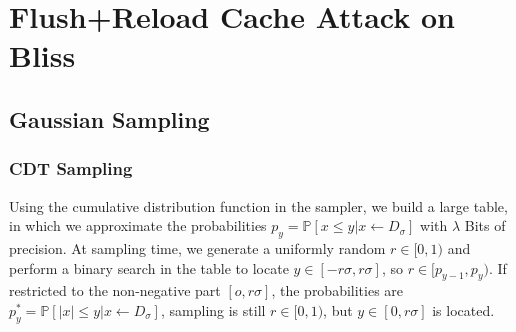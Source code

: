 %
%

\chapter{Flush+Reload Cache Attack on Bliss}
\label{bliss}

\section{Gaussian Sampling} %

\subsection{CDT Sampling}
Using the cumulative distribution function in the sampler, we build a large table, in which we approximate the probabilities $p_y=\mathbb{P}[x \le y| x \leftarrow D_\sigma ]$ with $\lambda$ Bits of precision. At sampling time, we generate a uniformly random $r \in [0,1)$ and perform a binary search in the table to locate $y \in [-r\sigma, r\sigma]$, so $r \in [p_{y-1}, p_y)$. If restricted to the non-negative part $[o, r\sigma]$, the probabilities are $p^*_y = \mathbb{P}[|x| \le y| x \leftarrow D_\sigma]$, sampling is still $r \in [0,1)$, but $y \in [0, r \sigma]$ is located. 

